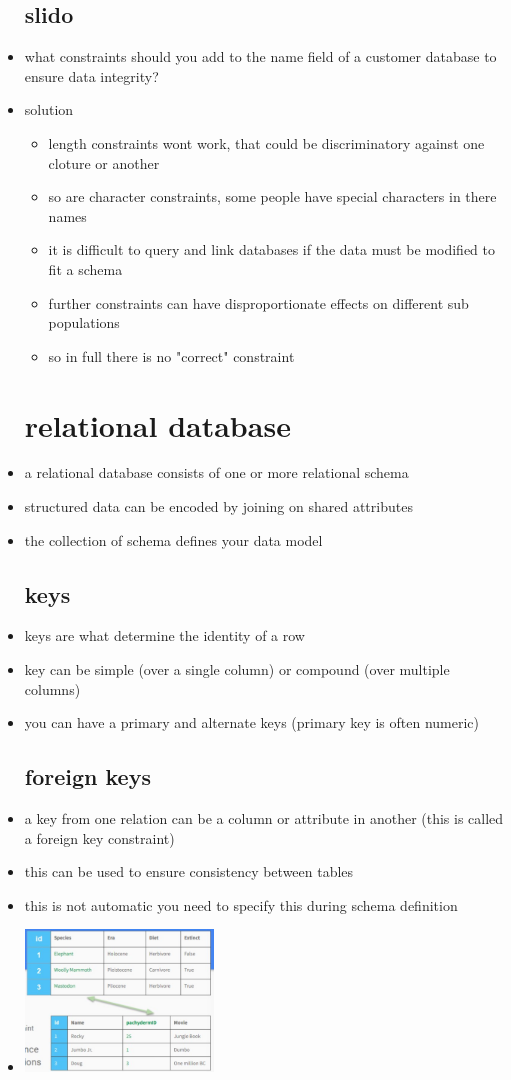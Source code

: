 \documentclass{article}
\begin{document}
\begin{itemize}
\subsection{slido}
\item what constraints should you add to the name field of a customer database to ensure data integrity?
\item solution 
\begin{itemize}
    \item length constraints wont work, that could be discriminatory against one cloture or another
    \item so are character constraints, some people have special characters in there names
    \item it is difficult to query and link databases if the data must be modified to fit a schema 
    \item further constraints can have disproportionate effects on different sub populations 
    \item so in full there is no "correct" constraint
\end{itemize}
\section{relational database}
\item a relational database consists of one or more relational schema 
\item structured data can be encoded by joining on shared attributes
\item the collection of schema defines your data model 
\subsection{keys}
\item keys are what determine the identity of a row
\item key can be simple (over a single column) or compound (over multiple columns) 
\item you can have a primary and alternate keys (primary key is often numeric) 
\subsection{foreign keys}
\item a key from one relation can be a column or attribute in another (this is called a foreign key constraint) 
\item this can be used to ensure consistency between tables
\item this is not automatic you need to specify this during schema definition 
\item \includegraphics[width=5cm]{lecture notes/week 2/immages/w_1_3.jpg}

\end{itemize}
\end{document}
